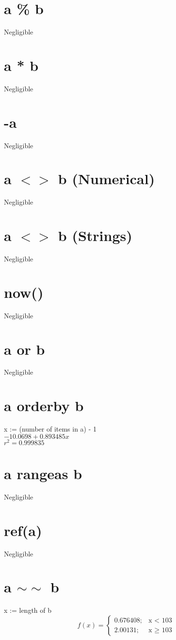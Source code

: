 \documentclass[12pt]{article}
\begin{document}
	\section{a \% b}
	Negligible
	
	\section{a * b}
	Negligible
	
	\section{-a}
	Negligible
	
	\section{a $<>$ b (Numerical)}
	Negligible
	
	\section{a $<>$ b (Strings)}
	Negligible
	
	\section{now()}
	Negligible
	
	\section{a or b}
	Negligible
	
	\section{a orderby b} %
	x := (number of items in a) - 1\\
	$-10.0698 + 0.893485 x$\\
	$r^2 = 0.999835$
	
	\section{a rangeas b}
	Negligible
	
	\section{ref(a)}
	Negligible
	
	\section{a $\sim\sim$ b}
	x := length of b
	\begin{displaymath}
		f(x) = \left\{
			\begin{array}{lr}
				0.676408; & \text{x $<$ 103}\\
				2.00131; & \text{x $\geq$ 103}
			\end{array}
		\right.
	\end{displaymath}
	
\end{document}
